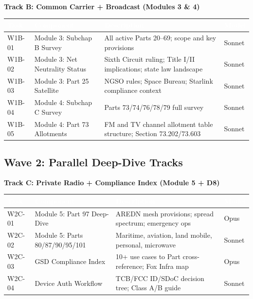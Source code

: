 \documentclass[11pt,letterpaper]{article}
\newcommand{\tableheader}[1]{\textbf{\sffamily\textcolor{white}{#1}}}
\begin{document}
\textbf{Track B: Common Carrier + Broadcast (Modules 3 \& 4)}

\begin{center}
\begin{tabularx}{\textwidth}{C{1.5cm}L{3.5cm}XC{1.5cm}}
\toprule
{}
\tableheader{Task} & \tableheader{Component} & \tableheader{Description} & \tableheader{Model} \\
\midrule
W1B-01 & Module 3: Subchap B Survey & All active Parts 20--69; scope and key provisions & Sonnet \\
W1B-02 & Module 3: Net Neutrality Status & Sixth Circuit ruling; Title I/II implications; state law landscape & Sonnet \\
W1B-03 & Module 3: Part 25 Satellite & NGSO rules; Space Bureau; Starlink compliance context & Sonnet \\
W1B-04 & Module 4: Subchap C Survey & Parts 73/74/76/78/79 full survey & Sonnet \\
W1B-05 & Module 4: Part 73 Allotments & FM and TV channel allotment table structure; Section 73.202/73.603 & Sonnet \\
\bottomrule
\end{tabularx}
\end{center}

\subsection{Wave 2: Parallel Deep-Dive Tracks}

\textbf{Track C: Private Radio + Compliance Index (Module 5 + D8)}

\begin{center}
\begin{tabularx}{\textwidth}{C{1.5cm}L{3.5cm}XC{1.5cm}}
\toprule
{}
\tableheader{Task} & \tableheader{Component} & \tableheader{Description} & \tableheader{Model} \\
\midrule
W2C-01 & Module 5: Part 97 Deep-Dive & AREDN mesh provisions; spread spectrum; emergency ops & Opus \\
W2C-02 & Module 5: Parts 80/87/90/95/101 & Maritime, aviation, land mobile, personal, microwave & Sonnet \\
W2C-03 & GSD Compliance Index & 10+ use cases to Part cross-reference; Fox Infra map & Opus \\
W2C-04 & Device Auth Workflow & TCB/FCC ID/SDoC decision tree; Class A/B guide & Sonnet \\
\bottomrule
\end{tabularx}
\end{center}
\end{document}
